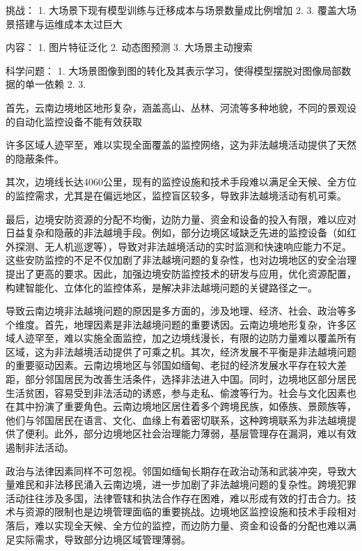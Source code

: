 挑战：
1. 大场景下现有模型训练与迁移成本与场景数量成比例增加
2. 
3. 覆盖大场景搭建与运维成本太过巨大

内容：
1. 图片特征泛化
2. 动态图预测
3. 大场景主动搜索

科学问题：
1. 大场景图像到图的转化及其表示学习，使得模型摆脱对图像局部数据的单一依赖
2. 
3.

首先，云南边境地区地形复杂，涵盖高山、丛林、河流等多种地貌，不同的景观设的自动化监控设备不能有效获取

许多区域人迹罕至，难以实现全面覆盖的监控网络，这为非法越境活动提供了天然的隐蔽条件。

其次，边境线长达4060公里，现有的监控设施和技术手段难以满足全天候、全方位的监控需求，尤其是在偏远地区，监控盲区较多，导致非法越境活动有机可乘。

最后，边境安防资源的分配不均衡，边防力量、资金和设备的投入有限，难以应对日益复杂和隐蔽的非法越境手段。例如，部分边境区域缺乏先进的监控设备（如红外探测、无人机巡逻等），导致对非法越境活动的实时监测和快速响应能力不足。这些安防监控的不足不仅加剧了非法越境问题的复杂性，也对边境地区的安全治理提出了更高的要求。因此，加强边境安防监控技术的研发与应用，优化资源配置，构建智能化、立体化的监控体系，是解决非法越境问题的关键路径之一。
















导致云南边境非法越境问题的原因是多方面的，涉及地理、经济、社会、政治等多个维度。首先，地理因素是非法越境问题的重要诱因。云南边境地形复杂，许多区域人迹罕至，难以实施全面监控，加之边境线漫长，有限的边防力量难以覆盖所有区域，这为非法越境活动提供了可乘之机。其次，经济发展不平衡是非法越境问题的重要驱动因素。云南边境地区与邻国如缅甸、老挝的经济发展水平存在较大差距，部分邻国居民为改善生活条件，选择非法进入中国。同时，边境地区部分居民生活贫困，容易受到非法活动的诱惑，参与走私、偷渡等行为。社会与文化因素也在其中扮演了重要角色。云南边境地区居住着多个跨境民族，如傣族、景颇族等，他们与邻国居民在语言、文化、血缘上有着密切联系，这种跨境联系为非法越境提供了便利。此外，部分边境地区社会治理能力薄弱，基层管理存在漏洞，难以有效遏制非法活动。

政治与法律因素同样不可忽视。邻国如缅甸长期存在政治动荡和武装冲突，导致大量难民和非法移民涌入云南边境，进一步加剧了非法越境问题的复杂性。跨境犯罪活动往往涉及多国，法律管辖和执法合作存在困难，难以形成有效的打击合力。技术与资源的限制也是边境管理面临的重要挑战。边境地区监控设施和技术手段相对落后，难以实现全天候、全方位的监控，而边防力量、资金和设备的分配也难以满足实际需求，导致部分边境区域管理薄弱。

